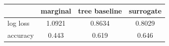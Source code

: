 \begin{tabular}{lccc}
\toprule
 & marginal & tree baseline & surrogate \\
\midrule
log loss & 1.0921 & 0.8634 & 0.8029 \\
accuracy & 0.443 & 0.619 & 0.646 \\
\bottomrule
\end{tabular}

